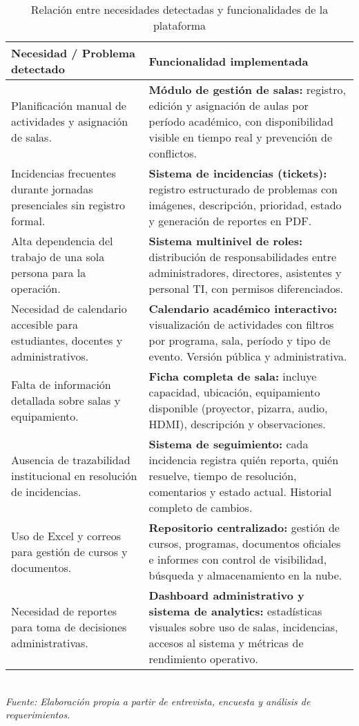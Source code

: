 \begin{table}[H]
\centering
\caption{Relación entre necesidades detectadas y funcionalidades de la plataforma}
\label{tab:necesidades-funcionalidades}
\begin{tabular}{p{6.5cm} p{8.5cm}}
\toprule
\textbf{Necesidad / Problema detectado} & \textbf{Funcionalidad implementada} \\
\midrule
Planificación manual de actividades y asignación de salas. 
& \textbf{Módulo de gestión de salas:} registro, edición y asignación de aulas por período académico, con disponibilidad visible en tiempo real y prevención de conflictos. \\[0.3cm]

Incidencias frecuentes durante jornadas presenciales sin registro formal. 
& \textbf{Sistema de incidencias (tickets):} registro estructurado de problemas con imágenes, descripción, prioridad, estado y generación de reportes en PDF. \\[0.3cm]

Alta dependencia del trabajo de una sola persona para la operación. 
& \textbf{Sistema multinivel de roles:} distribución de responsabilidades entre administradores, directores, asistentes y personal TI, con permisos diferenciados. \\[0.3cm]

Necesidad de calendario accesible para estudiantes, docentes y administrativos. 
& \textbf{Calendario académico interactivo:} visualización de actividades con filtros por programa, sala, período y tipo de evento. Versión pública y administrativa. \\[0.3cm]

Falta de información detallada sobre salas y equipamiento. 
& \textbf{Ficha completa de sala:} incluye capacidad, ubicación, equipamiento disponible (proyector, pizarra, audio, HDMI), descripción y observaciones. \\[0.3cm]

Ausencia de trazabilidad institucional en resolución de incidencias. 
& \textbf{Sistema de seguimiento:} cada incidencia registra quién reporta, quién resuelve, tiempo de resolución, comentarios y estado actual. Historial completo de cambios. \\[0.3cm]

Uso de Excel y correos para gestión de cursos y documentos. 
& \textbf{Repositorio centralizado:} gestión de cursos, programas, documentos oficiales e informes con control de visibilidad, búsqueda y almacenamiento en la nube. \\[0.3cm]

Necesidad de reportes para toma de decisiones administrativas. 
& \textbf{Dashboard administrativo y sistema de analytics:} estadísticas visuales sobre uso de salas, incidencias, accesos al sistema y métricas de rendimiento operativo. \\
\bottomrule
\end{tabular}
\\[0.2cm]
\textit{Fuente: Elaboración propia a partir de entrevista, encuesta y análisis de requerimientos.}
\end{table}

